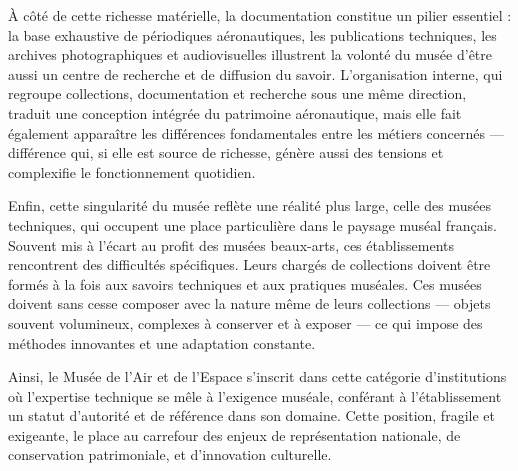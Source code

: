 À côté de cette richesse matérielle, la documentation constitue un pilier essentiel : la base exhaustive de périodiques aéronautiques, les publications techniques, les archives photographiques et audiovisuelles illustrent la volonté du musée d’être aussi un centre de recherche et de diffusion du savoir. L’organisation interne, qui regroupe collections, documentation et recherche sous une même direction, traduit une conception intégrée du patrimoine aéronautique, mais elle fait également apparaître les différences fondamentales entre les métiers concernés — différence qui, si elle est source de richesse, génère aussi des tensions et complexifie le fonctionnement quotidien.

Enfin, cette singularité du musée reflète une réalité plus large, celle des musées techniques, qui occupent une place particulière dans le paysage muséal français. Souvent mis à l’écart au profit des musées beaux-arts, ces établissements rencontrent des difficultés spécifiques. Leurs chargés de collections doivent être formés à la fois aux savoirs techniques et aux pratiques muséales. Ces musées doivent sans cesse composer avec la nature même de leurs collections — objets souvent volumineux, complexes à conserver et à exposer — ce qui impose des méthodes innovantes et une adaptation constante.

Ainsi, le Musée de l’Air et de l’Espace s’inscrit dans cette catégorie d’institutions où l’expertise technique se mêle à l’exigence muséale, conférant à l’établissement un statut d’autorité et de référence dans son domaine. Cette position, fragile et exigeante, le place au carrefour des enjeux de représentation nationale, de conservation patrimoniale, et d’innovation culturelle.
